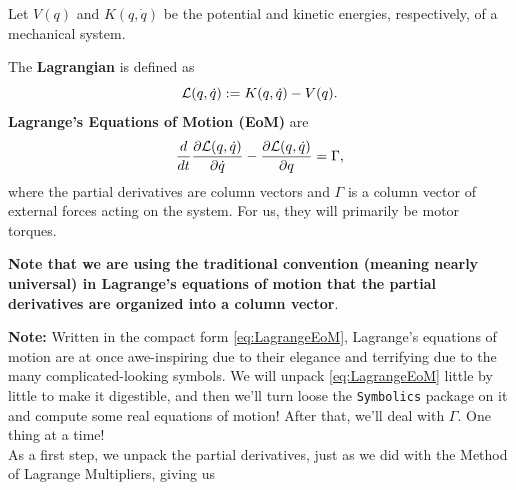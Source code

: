 \begin{tcolorbox}[colback=mylightblue, title = {\bf Lagrange's Equations of Motion}, breakable]

Let $V(q)$ and $K(q, \dot{q})$ be the potential and kinetic energies, respectively, of a mechanical system. 
\begin{definition} 
\label{def:LagrangianKminusV}
The \textbf{Lagrangian} is defined as
\begin{equation}
    \label{eq:LagrangianKminusV}
{\cal L}(q, \dot{q}):= K(q, \dot{q}) - V(q).
\end{equation}
\textbf{Lagrange's Equations of Motion (EoM)} are 
\begin{equation}
    \label{eq:LagrangeEoM}
\frac{d}{dt} \frac{ \partial {\cal L}(q, \dot{q})}{\partial\dot{q}} - \frac{ \partial {\cal L}(q, \dot{q})}{\partial q} = \Gamma,
\end{equation}
where the partial derivatives are column vectors and $\Gamma$ is a column vector of external forces acting on the system. For us, they will primarily be motor torques.
\end{definition}
\textbf{Note that we are using the traditional convention (meaning nearly universal) in Lagrange's equations of motion that the partial derivatives are organized into a column vector}. 
\bigskip

\textbf{Note:} Written in the compact form \eqref{eq:LagrangeEoM}, Lagrange's equations of motion are at once awe-inspiring due to their elegance and terrifying due to the many complicated-looking symbols. We will unpack \eqref{eq:LagrangeEoM} little by little to make it digestible, and then we'll turn loose the \texttt{Symbolics} package on it and compute some real equations of motion! After that, we'll deal with $\Gamma$. One thing at a time!\\

As a first step, we unpack the partial derivatives, just as we did with the Method of Lagrange Multipliers, giving us


\end{tcolorbox}
